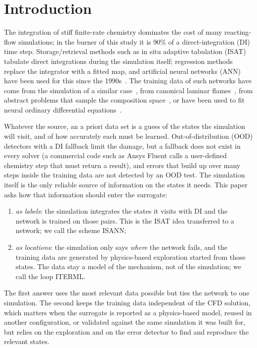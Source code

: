 \documentclass[preprint,review,12pt]{elsarticle}
\begin{document}
\section{Introduction}
\label{sec:intro}

The integration of stiff finite-rate chemistry dominates the cost of many reacting-flow simulations; in
the burner of this study it is 90\% of a direct-integration (DI) time step. Storage/retrieval methods such
as in situ adaptive tabulation (ISAT)~\cite{pope1997isat} tabulate direct integrations during the
simulation itself; regression methods replace the integrator with a fitted map, and artificial neural
networks (ANN) have been used for this since the 1990s~\cite{christo1996ann,blasco1998ann}. The training
data of such networks have come from the simulation of a similar case~\cite{sen2010les}, from canonical
laminar flames~\cite{ihme2009ann}, from abstract problems that sample the composition
space~\cite{franke2017rcce,ding2021hybrid,readshaw2021hybrid}, or have been used to fit neural ordinary
differential equations~\cite{owoyele2022chemnode}.

Whatever the source, an a priori data set is a guess of the states the simulation will visit, and of how
accurately each must be learned. Out-of-distribution (OOD) detectors with a DI fallback limit the damage,
but a fallback does not exist in every solver (a commercial code such as Ansys Fluent calls a user-defined
chemistry step that must return a result), and errors that build up over many steps inside the training
data are not detected by an OOD test. The simulation itself is the only reliable source of information on
the states it needs. This paper asks how that information should enter the surrogate:
\begin{enumerate}
\item \emph{as labels}: the simulation integrates the states it visits with DI and the network is trained
  on those pairs. This is the ISAT idea transferred to a network; we call the scheme ISANN;
\item \emph{as locations}: the simulation only says \emph{where} the network fails, and the training data
  are generated by physics-based exploration started from those states. The data stay a model of the
  mechanism, not of the simulation; we call the loop ITERML.
\end{enumerate}
The first answer uses the most relevant data possible but ties the network to one simulation. The second
keeps the training data independent of the CFD solution, which matters when the surrogate is reported as a
physics-based model, reused in another configuration, or validated against the same simulation it was
built for, but relies on the exploration and on the error detector to find and reproduce the relevant
states.
\end{document}
